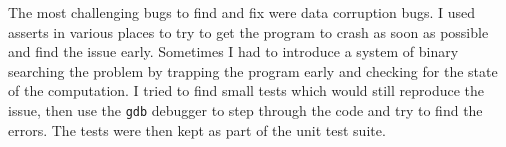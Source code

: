 The most challenging bugs to find and fix were data corruption bugs.
I used asserts in various places to try to get the program to crash as soon as possible
and find the issue early. Sometimes I had to introduce a system of binary searching the
problem by trapping the program early and checking for the state of the computation.
I tried to find small tests which would still reproduce the issue, then use the
\texttt{gdb} debugger to step through the code and try to find the errors. The tests
were then kept as part of the unit test suite.
